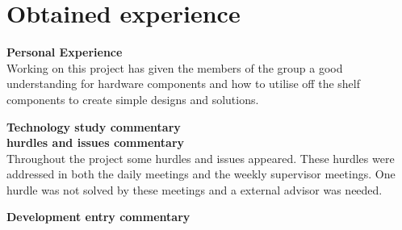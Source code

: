 \chapter{Obtained experience}

\textbf{Personal Experience}\\
Working on this project has given the members of the group a good understanding for hardware components and how to utilise off the shelf components to create simple designs and solutions. 

\textbf{Technology study commentary}\\

\textbf{hurdles and issues commentary}\\
Throughout the project some hurdles and issues appeared. These hurdles were addressed in both the daily meetings and the weekly supervisor meetings. One hurdle was not solved by these meetings and a external advisor was needed.

\textbf{Development entry commentary}\\